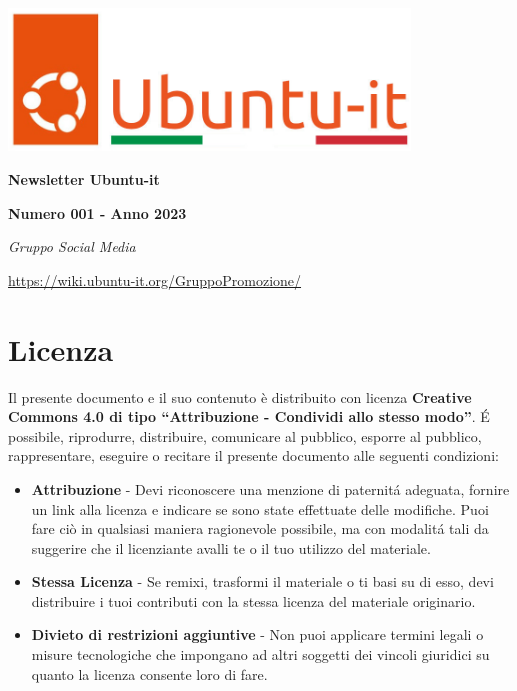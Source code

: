 \documentclass[a4paper,twoside]{article}
\begin{document}
\begin{titlepage} 
\parbox{0.83\textwidth}{%
	\smash{\textcolor{ubuntuarancio}{\rule[-\textheight]{15pt}{\textheight}}}\hfill 
\parbox[b][\textheight]{0.75\textwidth}{\centering
		\includegraphics[width=0.8\textwidth]{immagini/newlogo1.png}
		\vspace{1\baselineskip}
		
		\textbf{\Huge Newsletter Ubuntu-it}\vspace{0.5\baselineskip}

		\textbf{\Large Numero 001 - Anno 2023}\vspace{0.5\baselineskip}		
		
		\textit{\large Gruppo Social Media}
		
		\url{https://wiki.ubuntu-it.org/GruppoPromozione/}\vspace{\baselineskip}
}}
\end{titlepage}
\clearpage
\hfill
\vfill
{}
\thispagestyle{empty}
\section*{Licenza}
Il presente documento e il suo contenuto è distribuito con licenza \textbf{Creative Commons 4.0 di tipo “Attribuzione - Condividi allo stesso modo”}. \'E possibile, riprodurre, distribuire, comunicare al pubblico, esporre al pubblico, rappresentare, eseguire o recitare il presente documento alle seguenti condizioni:

\begin{itemize}
\item \textbf{Attribuzione} - Devi riconoscere una menzione di paternit\'a adeguata, fornire un link alla licenza e indicare se sono state effettuate delle modifiche. Puoi fare ciò in qualsiasi maniera ragionevole possibile, ma con modalit\'a tali da suggerire che il licenziante avalli te o il tuo utilizzo del materiale.
\item \textbf{Stessa Licenza} - Se remixi, trasformi il materiale o ti basi su di esso, devi distribuire i tuoi contributi con la stessa licenza del materiale originario.
\item \textbf{Divieto di restrizioni aggiuntive} - Non puoi applicare termini legali o misure tecnologiche che impongano ad altri soggetti dei vincoli giuridici su quanto la licenza consente loro di fare.
\end{itemize}
\end{document}
